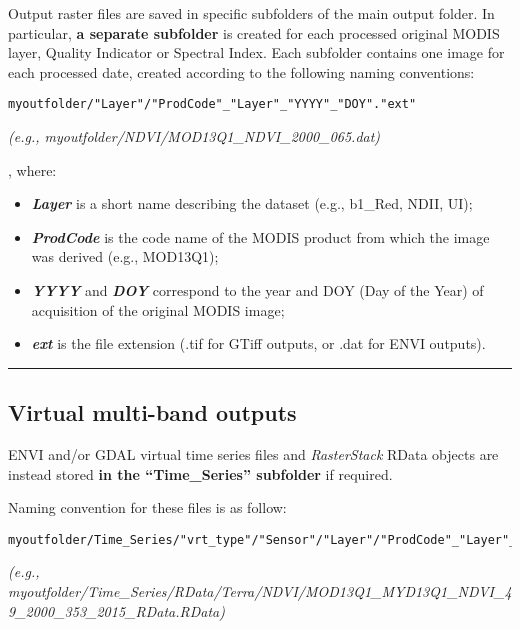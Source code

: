 \documentclass[]{article}
\providecommand{\tightlist}{%
  \setlength{\itemsep}{0pt}\setlength{\parskip}{0pt}}
\begin{document}
Output raster files are saved in specific subfolders of the main output
folder. In particular, \textbf{a separate subfolder} is created for each
processed original MODIS layer, Quality Indicator or Spectral Index.
Each subfolder contains one image for each processed date, created
according to the following naming conventions:

\begin{verbatim}
myoutfolder/"Layer"/"ProdCode"_"Layer"_"YYYY"_"DOY"."ext"
\end{verbatim}

 \emph{(e.g., myoutfolder/NDVI/MOD13Q1\_NDVI\_2000\_065.dat)}

, where:

\begin{itemize}
\tightlist
\item
  \textbf{\emph{Layer}} is a short name describing the dataset (e.g.,
  b1\_Red, NDII, UI);
\item
  \textbf{\emph{ProdCode}} is the code name of the MODIS product from
  which the image was derived (e.g., MOD13Q1);
\item
  \textbf{\emph{YYYY}} and \textbf{\emph{DOY}} correspond to the year
  and DOY (Day of the Year) of acquisition of the original MODIS image;
\item
  \textbf{\emph{ext}} is the file extension (.tif for GTiff outputs, or
  .dat for ENVI outputs).
\end{itemize}

\begin{center}\rule{0.5\linewidth}{\linethickness}\end{center}

\subsection{Virtual multi-band
outputs}\label{virtual-multi-band-outputs}

ENVI and/or GDAL virtual time series files and \emph{RasterStack} RData
objects are instead stored \textbf{in the ``Time\_Series'' subfolder} if
required.

Naming convention for these files is as follow:

\begin{verbatim}
myoutfolder/Time_Series/"vrt_type"/"Sensor"/"Layer"/"ProdCode"_"Layer"_"StartDOY"_"StartYear_"EndDOY"_"EndYear_"suffix".ext" 
\end{verbatim}

 \emph{(e.g.,
myoutfolder/Time\_Series/RData/Terra/NDVI/MOD13Q1\_MYD13Q1\_NDVI\_49\_2000\_353\_2015\_RData.RData)}
\end{document}
